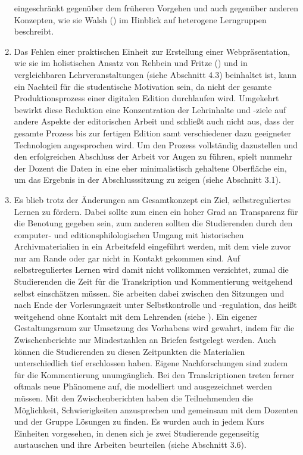 \documentclass[
          a4paper,
        ]{article}
\begin{document}
\begin{enumerate}
  eingeschränkt gegenüber dem früheren Vorgehen und auch gegenüber
  anderen Konzepten, wie sie Walsh () im
  Hinblick auf heterogene Lerngruppen beschreibt.
\item
  Das Fehlen einer praktischen Einheit zur Erstellung einer
  Webpräsentation, wie sie im holistischen Ansatz von Rehbein und Fritze
  () und in vergleichbaren
  Lehrveranstaltungen (siehe Abschnitt 4.3) beinhaltet ist, kann ein
  Nachteil für die studentische Motivation sein, da nicht der gesamte
  Produktionsprozess einer digitalen Edition durchlaufen wird. Umgekehrt
  bewirkt diese Reduktion eine Konzentration der Lehrinhalte und -ziele
  auf andere Aspekte der editorischen Arbeit und schließt auch nicht
  aus, dass der gesamte Prozess bis zur fertigen Edition samt
  verschiedener dazu geeigneter Technologien angesprochen wird. Um den
  Prozess vollständig dazustellen und den erfolgreichen Abschluss der
  Arbeit vor Augen zu führen, spielt nunmehr der Dozent die Daten in
  eine eher minimalistisch gehaltene Oberfläche ein, um das Ergebnis in
  der Abschlusssitzung zu zeigen (siehe Abschnitt 3.1).
\item
  Es blieb trotz der Änderungen am Gesamtkonzept ein Ziel,
  selbstreguliertes Lernen zu fördern. Dabei sollte zum einen ein hoher
  Grad an Transparenz für die Benotung gegeben sein, zum anderen sollten
  die Studierenden durch den computer- und editionsphilologischen Umgang
  mit historischen Archivmaterialien in ein Arbeitsfeld eingeführt
  werden, mit dem viele zuvor nur am Rande oder gar nicht in Kontakt
  gekommen sind. Auf selbstreguliertes Lernen wird damit nicht
  vollkommen verzichtet, zumal die Studierenden die Zeit für die
  Transkription und Kommentierung weitgehend selbst einschätzen müssen.
  Sie arbeiten dabei zwischen den Sitzungen und nach Ende der
  Vorlesungszeit unter Selbstkontrolle und -regulation, das heißt
  weitgehend ohne Kontakt mit dem Lehrenden (siehe
  ). Ein eigener
  Gestaltungsraum zur Umsetzung des Vorhabens wird gewahrt, indem für
  die Zwischenberichte nur Mindestzahlen an Briefen festgelegt werden.
  Auch können die Studierenden zu diesen Zeitpunkten die Materialien
  unterschiedlich tief erschlossen haben. Eigene Nachforschungen sind
  zudem für die Kommentierung unumgänglich. Bei den Transkriptionen
  treten ferner oftmals neue Phänomene auf, die modelliert und
  ausgezeichnet werden müssen. Mit den Zwischenberichten haben die
  Teilnehmenden die Möglichkeit, Schwierigkeiten anzusprechen und
  gemeinsam mit dem Dozenten und der Gruppe Lösungen zu finden. Es
  wurden auch in jedem Kurs Einheiten vorgesehen, in denen sich je zwei
  Studierende gegenseitig austauschen und ihre Arbeiten beurteilen
  (siehe Abschnitt 3.6).
\end{enumerate}
\end{document}
